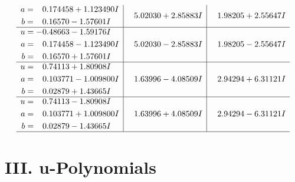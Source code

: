 \documentclass[1p]{elsarticle_modified}
\theoremstyle{definition}
\begin{document}
$$\begin{array}{c|c|c}
\begin{aligned}
a &= \phantom{-}0.174458 + 1.123490 I \\
b &= \phantom{-}0.16570 - 1.57601 I\end{aligned}
 & \phantom{-}5.02030 + 2.85883 I & \phantom{-}1.98205 + 2.55647 I \\ \hline\begin{aligned}
u &= -0.48663 - 1.59176 I \\
a &= \phantom{-}0.174458 - 1.123490 I \\
b &= \phantom{-}0.16570 + 1.57601 I\end{aligned}
 & \phantom{-}5.02030 - 2.85883 I & \phantom{-}1.98205 - 2.55647 I \\ \hline\begin{aligned}
u &= \phantom{-}0.74113 + 1.80908 I \\
a &= \phantom{-}0.103771 - 1.009800 I \\
b &= \phantom{-}0.02879 + 1.43665 I\end{aligned}
 & \phantom{-}1.63996 - 4.08509 I & \phantom{-}2.94294 + 6.31121 I \\ \hline\begin{aligned}
u &= \phantom{-}0.74113 - 1.80908 I \\
a &= \phantom{-}0.103771 + 1.009800 I \\
b &= \phantom{-}0.02879 - 1.43665 I\end{aligned}
 & \phantom{-}1.63996 + 4.08509 I & \phantom{-}2.94294 - 6.31121 I\\
 \hline 
 \end{array}$$\newpage
\newpage\renewcommand{\arraystretch}{1}
\centering \section*{ III. u-Polynomials}
\end{document}
